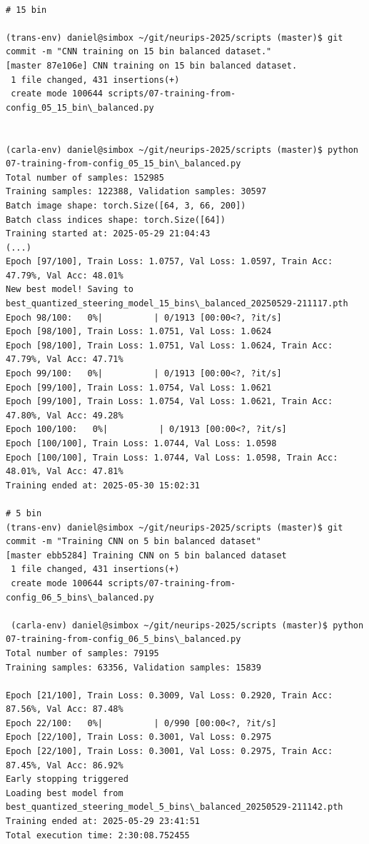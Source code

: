 \begin{verbatim}

# 15 bin

(trans-env) daniel@simbox ~/git/neurips-2025/scripts (master)$ git commit -m "CNN training on 15 bin balanced dataset."
[master 87e106e] CNN training on 15 bin balanced dataset.
 1 file changed, 431 insertions(+)
 create mode 100644 scripts/07-training-from-config_05_15_bin\_balanced.py
 

(carla-env) daniel@simbox ~/git/neurips-2025/scripts (master)$ python 07-training-from-config_05_15_bin\_balanced.py
Total number of samples: 152985
Training samples: 122388, Validation samples: 30597
Batch image shape: torch.Size([64, 3, 66, 200])
Batch class indices shape: torch.Size([64])
Training started at: 2025-05-29 21:04:43
(...)
Epoch [97/100], Train Loss: 1.0757, Val Loss: 1.0597, Train Acc: 47.79%, Val Acc: 48.01%
New best model! Saving to best_quantized_steering_model_15_bins\_balanced_20250529-211117.pth
Epoch 98/100:   0%|          | 0/1913 [00:00<?, ?it/s]
Epoch [98/100], Train Loss: 1.0751, Val Loss: 1.0624
Epoch [98/100], Train Loss: 1.0751, Val Loss: 1.0624, Train Acc: 47.79%, Val Acc: 47.71%
Epoch 99/100:   0%|          | 0/1913 [00:00<?, ?it/s]
Epoch [99/100], Train Loss: 1.0754, Val Loss: 1.0621
Epoch [99/100], Train Loss: 1.0754, Val Loss: 1.0621, Train Acc: 47.80%, Val Acc: 49.28%
Epoch 100/100:   0%|          | 0/1913 [00:00<?, ?it/s]
Epoch [100/100], Train Loss: 1.0744, Val Loss: 1.0598
Epoch [100/100], Train Loss: 1.0744, Val Loss: 1.0598, Train Acc: 48.01%, Val Acc: 47.81%
Training ended at: 2025-05-30 15:02:31

# 5 bin
(trans-env) daniel@simbox ~/git/neurips-2025/scripts (master)$ git commit -m "Training CNN on 5 bin balanced dataset"
[master ebb5284] Training CNN on 5 bin balanced dataset
 1 file changed, 431 insertions(+)
 create mode 100644 scripts/07-training-from-config_06_5_bins\_balanced.py

 (carla-env) daniel@simbox ~/git/neurips-2025/scripts (master)$ python 07-training-from-config_06_5_bins\_balanced.py
Total number of samples: 79195
Training samples: 63356, Validation samples: 15839

Epoch [21/100], Train Loss: 0.3009, Val Loss: 0.2920, Train Acc: 87.56%, Val Acc: 87.48%
Epoch 22/100:   0%|          | 0/990 [00:00<?, ?it/s]
Epoch [22/100], Train Loss: 0.3001, Val Loss: 0.2975
Epoch [22/100], Train Loss: 0.3001, Val Loss: 0.2975, Train Acc: 87.45%, Val Acc: 86.92%
Early stopping triggered
Loading best model from best_quantized_steering_model_5_bins\_balanced_20250529-211142.pth
Training ended at: 2025-05-29 23:41:51
Total execution time: 2:30:08.752455


\end{verbatim}
